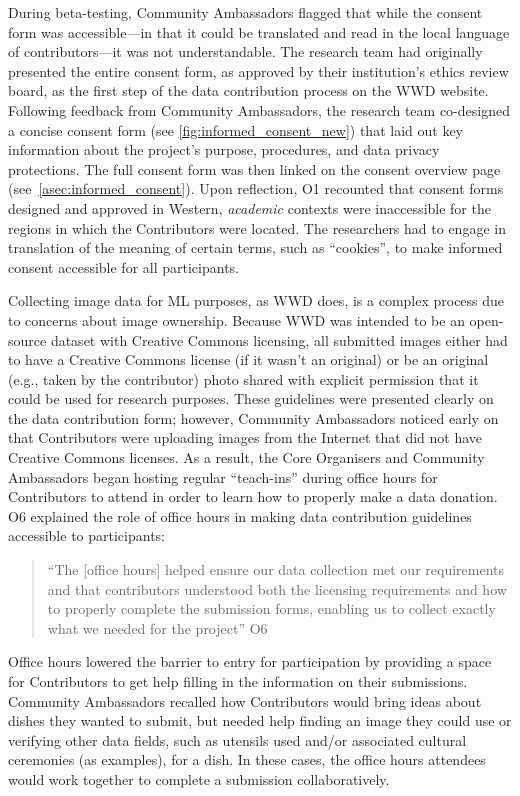 During beta-testing, Community Ambassadors flagged that while the consent form was accessible---in that it could be translated and read in the local language of contributors---it was not understandable. The research team had originally presented the entire consent form, as approved by their institution's ethics review board, as the first step of the data contribution process on the \textsc{WWD} website. Following feedback from Community Ambassadors, the research team co-designed a concise consent form (see \ref{fig:informed_consent_new}) that laid out key information about the project's purpose, procedures, and data privacy protections. The full consent form was then linked on the consent overview page (see~\cref{asec:informed_consent}). Upon reflection, O1 recounted that consent forms designed and approved in Western, \textit{academic} contexts were inaccessible for the regions in which the Contributors were located. The researchers had to engage in translation of the meaning of certain terms, such as ``cookies'', to make informed consent accessible for all participants. 

Collecting image data for ML purposes, as \textsc{WWD} does, is a complex process due to concerns about image ownership. Because \textsc{WWD} was intended to be an open-source dataset with Creative Commons licensing, all submitted images either had to have a Creative Commons license (if it wasn't an original) or be an original (e.g., taken by the contributor) photo shared with explicit permission that it could be used for research purposes. These guidelines were presented clearly on the data contribution form; however, Community Ambassadors noticed early on that Contributors were uploading images from the Internet that did not have Creative Commons licenses. As a result, the Core Organisers and Community Ambassadors began hosting regular ``teach-ins'' during office hours for Contributors to attend in order to learn how to properly make a data donation. O6 explained the role of office hours in making data contribution guidelines accessible to participants:
\begin{quote}
    ``The [office hours] helped ensure our data collection met our requirements and that contributors understood both the licensing requirements and how to properly complete the submission forms, enabling us to collect exactly what we needed for the project'' O6
\end{quote}
Office hours lowered the barrier to entry for participation by providing a space for Contributors to get help filling in the information on their submissions. Community Ambassadors recalled how Contributors would bring ideas about dishes they wanted to submit, but needed help finding an image they could use or verifying other data fields, such as utensils used and/or associated cultural ceremonies (as examples), for a dish. In these cases, the office hours attendees would work together to complete a submission collaboratively. 

